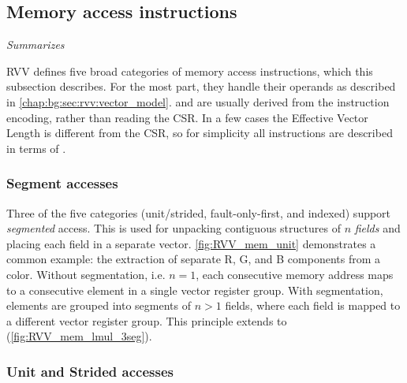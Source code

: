 \subsection{Memory access instructions}
\emph{Summarizes \cite[Sections 7-9]{RISCVVectorExtension2021}}

RVV defines five broad categories of memory access instructions, which this subsection describes.
For the most part, they handle their operands as described in \cref{chap:bg:sec:rvv:vector_model}.
 and  are usually derived from the instruction encoding, rather than reading the  CSR.
In a few cases the Effective Vector Length  is different from the  CSR, so for simplicity all instructions are described in terms of .

\subsubsection{Segment accesses}
Three of the five categories (unit/strided, fault-only-first, and indexed) support \emph{segmented} access.
This is used for unpacking contiguous structures of $n$ \emph{fields} and placing each field in a separate vector.
\cref{fig:RVV_mem_unit} demonstrates a common example: the extraction of separate R, G, and B components from a color.
Without segmentation, i.e. $n = 1$, each consecutive memory address maps to a consecutive element in a single vector register group.
With segmentation, elements are grouped into segments of $n > 1$ fields, where each field is mapped to a different vector register group.
This principle extends to  (\cref{fig:RVV_mem_lmul_3seg}).



\newcommand{\param}[1]{\textbf{\textcolor{Blue}{#1}}}
\newcommand{\paramt}[1]{\code{\param{#1}}}


\pagebreak
\subsubsection{Unit and Strided accesses}\label{chap:bg:sec:rvv:unitstrideaccess}

